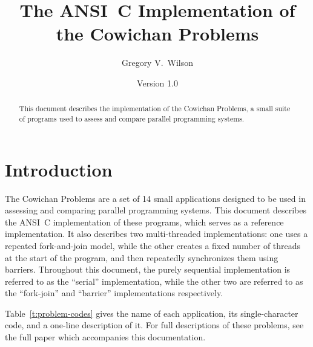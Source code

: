 %
%

\author{Gregory V.\ Wilson}
\title{The ANSI~C Implementation of\\the Cowichan Problems}
\date{Version 1.0}

\newenvironment{progtext}%
{\begin{small}\begin{alltt}}%
{\end{alltt}\end{small}}


\maketitle

\begin{abstract}
This document describes the implementation of the Cowichan Problems,
a small suite of programs used to assess and compare parallel programming systems.
\end{abstract}

\section{Introduction\label{s:intro}}

The Cowichan Problems are a set of 14 small applications
designed to be used in assessing and comparing parallel programming systems.
This document describes the ANSI~C implementation of these programs,
which serves as a reference implementation.
It also describes two multi-threaded implementations:
one uses a repeated fork-and-join model,
while the other creates a fixed number of threads
at the start of the program,
and then repeatedly synchronizes them using barriers.
Throughout this document,
the purely sequential implementation is referred to as the ``serial'' implementation,
while the other two are referred to as the ``fork-join'' and ``barrier'' implementations
respectively.

Table~\ref{t:problem-codes} gives the name of each application,
its single-character code,
and a one-line description of it.
For full descriptions of these problems,
see the full paper which accompanies this documentation.

